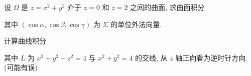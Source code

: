 设 $\Omega$ 是 $z = x^{2} + y^{2}$ 介于 $z = 0$ 和 $z = 2$ 之间的曲面, 求曲面积分\par
\nopagebreak[4]
其中 $(\cos\alpha,\cos\beta,\cos\gamma)$ 为 $\Sigma$ 的单位外法向量.\par
\par{}
计算曲线积分\par
\nopagebreak[4]
其中 $L$ 为 $x^{2} + y^{2} + z^{2} = 4$ 与 $x^{2} + y^{2} = 4$ 的交线, 从 $z$ 轴正向看为逆时针方向. (可能有误)\par
